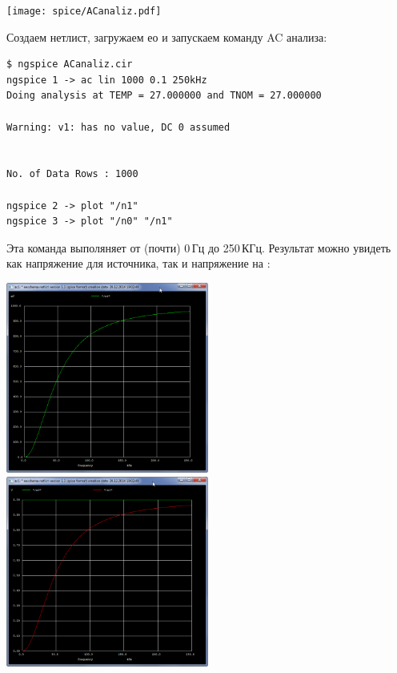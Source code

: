 \texttt{[image: spice/ACanaliz.pdf]}

Создаем нетлист, загружаем ео и запускаем команду AC анализа:

\begin{verbatim}
$ ngspice ACanaliz.cir
ngspice 1 -> ac lin 1000 0.1 250kHz
Doing analysis at TEMP = 27.000000 and TNOM = 27.000000

Warning: v1: has no value, DC 0 assumed


No. of Data Rows : 1000

ngspice 2 -> plot "/n1"
ngspice 3 -> plot "/n0" "/n1"
\end{verbatim}

Эта команда выполяняет  от (почти) 0\,Гц до 250\,КГц.
Результат можно увидеть как напряжение для источника, так и напряжение на
:

\noindent
\includegraphics[width=0.5\textwidth]{spice/spice4.png}
\includegraphics[width=0.5\textwidth]{spice/spice5.png}

% 
% 

\secup\secup
